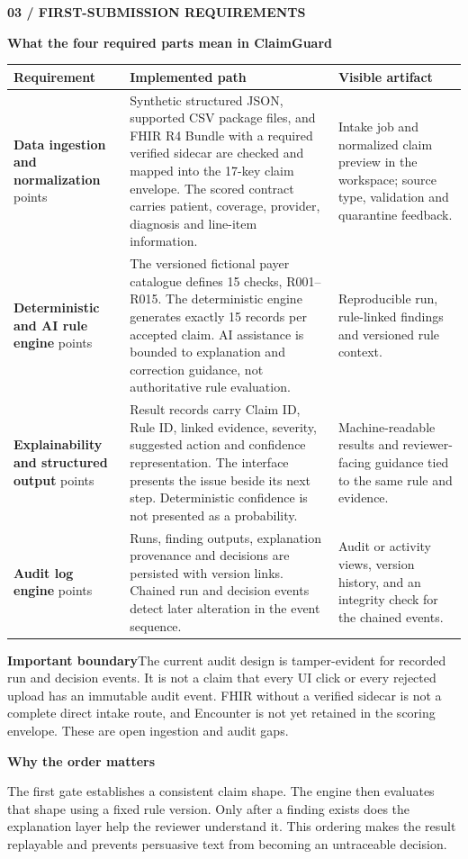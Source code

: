 \documentclass[10pt]{article}
\newcommand{\eyebrow}[1]{{\textbf{\footnotesize\color{teal}\MakeUppercase{#1}}\par}}
\newcommand{\claimtitle}[1]{{\fontsize{23}{27}\selectfont\bfseries\color{navy}#1\par}}
\newcommand{\smalltitle}[1]{{\large\bfseries\color{navy}#1\par}}
\newcommand{\callout}[2]{%
  \noindent\colorbox{pale}{\begin{minipage}{\dimexpr\linewidth-2\fboxsep\relax}
  \textbf{\color{navy}#1}\quad\color{slate}#2
  \end{minipage}}\par}
\begin{document}
\eyebrow{03 / first-submission requirements}
\claimtitle{What the four required parts mean in ClaimGuard}
\vspace{3mm}
\begin{tabularx}{\linewidth}{>{\RaggedRight\arraybackslash}p{.245\linewidth} >{\RaggedRight\arraybackslash}X >{\RaggedRight\arraybackslash}p{.255\linewidth}}
\rowcolor{pale}\textbf{\color{navy}Requirement} & \textbf{\color{navy}Implemented path} & \textbf{\color{navy}Visible artifact}\tabularnewline\hline
\textbf{Data ingestion and normalization}\newline 15 points & Synthetic structured JSON, supported CSV package files, and FHIR R4 Bundle with a required verified sidecar are checked and mapped into the 17-key claim envelope. The scored contract carries patient, coverage, provider, diagnosis and line-item information. & Intake job and normalized claim preview in the workspace; source type, validation and quarantine feedback.\\\hline
\textbf{Deterministic and AI rule engine}\newline 15 points & The versioned fictional payer catalogue defines 15 checks, R001--R015. The deterministic engine generates exactly 15 records per accepted claim. AI assistance is bounded to explanation and correction guidance, not authoritative rule evaluation. & Reproducible run, rule-linked findings and versioned rule context.\\\hline
\textbf{Explainability and structured output}\newline 10 points & Result records carry Claim ID, Rule ID, linked evidence, severity, suggested action and confidence representation. The interface presents the issue beside its next step. Deterministic confidence is not presented as a probability. & Machine-readable results and reviewer-facing guidance tied to the same rule and evidence.\\\hline
\textbf{Audit log engine}\newline 10 points & Runs, finding outputs, explanation provenance and decisions are persisted with version links. Chained run and decision events detect later alteration in the event sequence. & Audit or activity views, version history, and an integrity check for the chained events.\\\hline
\end{tabularx}
\vspace{5mm}
\callout{Important boundary}{The current audit design is tamper-evident for recorded run and decision events. It is not a claim that every UI click or every rejected upload has an immutable audit event. FHIR without a verified sidecar is not a complete direct intake route, and Encounter is not yet retained in the scoring envelope. These are open ingestion and audit gaps.}
\vspace{4mm}
\smalltitle{Why the order matters}
The first gate establishes a consistent claim shape. The engine then evaluates that shape using a fixed rule version. Only after a finding exists does the explanation layer help the reviewer understand it. This ordering makes the result replayable and prevents persuasive text from becoming an untraceable decision.
\newpage
\end{document}
